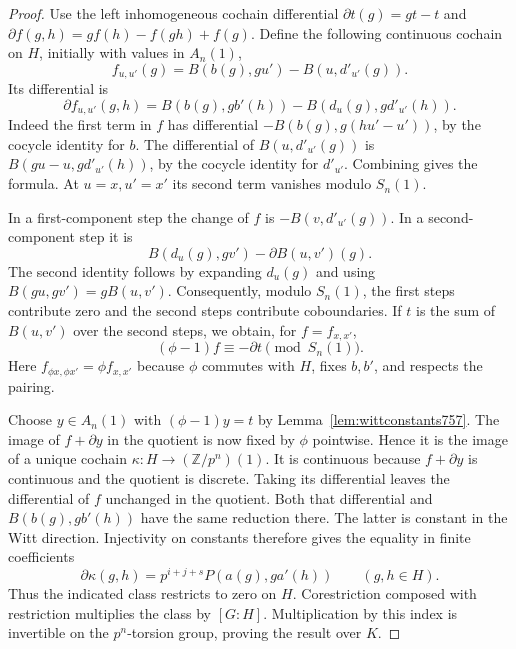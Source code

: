 \documentclass[a4paper,11pt]{article}
\theoremstyle{definition}
\theoremstyle{remark}
\newcommand{\ZZ}{\mathbb Z}\newcommand{\ord}{\operatorname{ord}}
\numberwithin{equation}{section}
\begin{document}
\begin{proof}
Use the left inhomogeneous cochain differential
\(\partial t(g)=gt-t\) and
\(\partial f(g,h)=g f(h)-f(gh)+f(g)\). Define the following
continuous cochain on \(H\), initially with values in \(A_n(1)\),
\[
             f_{u,u'}(g)=B(b(g),gu')-B(u,d'_{u'}(g)).
\]
Its differential is
\[
 \partial f_{u,u'}(g,h)=B(b(g),g b'(h))
                              -B(d_u(g),g d'_{u'}(h)).
\]
Indeed the first term in \(f\) has differential
\(-B(b(g),g(hu'-u'))\), by the cocycle identity for \(b\).
The differential of \(B(u,d'_{u'}(g))\) is
\(B(gu-u,g d'_{u'}(h))\), by the cocycle identity for
\(d'_{u'}\). Combining gives the formula. At \(u=x,u'=x'\)
its second term vanishes modulo \(S_n(1)\).

In a first-component step the change of \(f\) is
\(-B(v,d'_{u'}(g))\). In a second-component step it is
\[
          B(d_u(g),gv')-\partial B(u,v')(g).
\]
The second identity follows by expanding \(d_u(g)\) and
using \(B(gu,gv')=gB(u,v')\). Consequently, modulo \(S_n(1)\),
the first steps contribute zero and the second steps contribute
coboundaries. If \(t\) is the sum of \(B(u,v')\) over the
second steps, we obtain, for \(f=f_{x,x'}\),
\[
                 (\phi-1)f \equiv -\partial t\pmod{S_n(1)}.
\]
Here \(f_{\phi x,\phi x'}=\phi f_{x,x'}\) because \(\phi\)
commutes with \(H\), fixes \(b,b'\), and respects the pairing.

Choose \(y\in A_n(1)\) with \((\phi-1)y=t\) by
Lemma~\ref{lem:wittconstants757}. The image of \(f+\partial y\)
in the quotient is now fixed by \(\phi\) pointwise. Hence it is
the image of a unique cochain \(\kappa:H\to(\ZZ/p^n)(1)\).
It is continuous because \(f+\partial y\) is continuous and
the quotient is discrete. Taking its differential leaves the
differential of \(f\) unchanged in the quotient. Both that
differential and \(B(b(g),g b'(h))\) have the same reduction
there. The latter is constant in the Witt direction. Injectivity
on constants therefore gives the equality in finite coefficients
\[
       \partial\kappa(g,h)=p^{i+j+s}P(a(g),g a'(h))
                                            \qquad(g,h\in H).
\]
Thus the indicated class restricts to zero on \(H\).
Corestriction composed with restriction multiplies the class by
\([G:H]\). Multiplication by this index is invertible on the
\(p^n\)-torsion group, proving the result over \(K\).
\end{proof}
\end{document}
